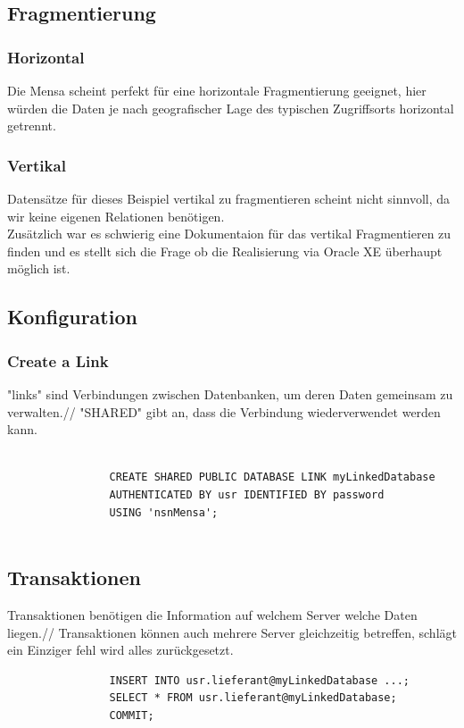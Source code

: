 \documentclass[12pt,a4paper]{article}
\begin{document}
		\subsection{Fragmentierung}
			\subsubsection{Horizontal}
				Die Mensa scheint perfekt für eine horizontale Fragmentierung geeignet, hier würden die Daten je nach geografischer Lage des typischen Zugriffsorts horizontal getrennt.
			\subsubsection{Vertikal}
				Datensätze für dieses Beispiel vertikal zu fragmentieren scheint nicht sinnvoll, da wir keine eigenen Relationen benötigen.\\
				Zusätzlich war es schwierig eine Dokumentaion für das vertikal Fragmentieren zu finden und es stellt sich die Frage ob die Realisierung via Oracle XE überhaupt möglich ist.
		\subsection{Konfiguration}
			\subsubsection{Create a Link}
			
				"links" sind Verbindungen zwischen Datenbanken, um deren Daten gemeinsam zu verwalten.//
				"SHARED" gibt an, dass die Verbindung wiederverwendet werden kann.
				\begin{verbatim}

				CREATE SHARED PUBLIC DATABASE LINK myLinkedDatabase
				AUTHENTICATED BY usr IDENTIFIED BY password
				USING 'nsnMensa';
				
				\end{verbatim}
				
        \subsection{Transaktionen}
            Transaktionen benötigen die Information auf welchem Server welche Daten liegen.//
            Transaktionen können auch mehrere Server gleichzeitig betreffen, schlägt ein Einziger fehl wird alles zurückgesetzt.
            \begin{verbatim}
                INSERT INTO usr.lieferant@myLinkedDatabase ...;
                SELECT * FROM usr.lieferant@myLinkedDatabase;
                COMMIT;
	        \end{verbatim}
\end{document}
